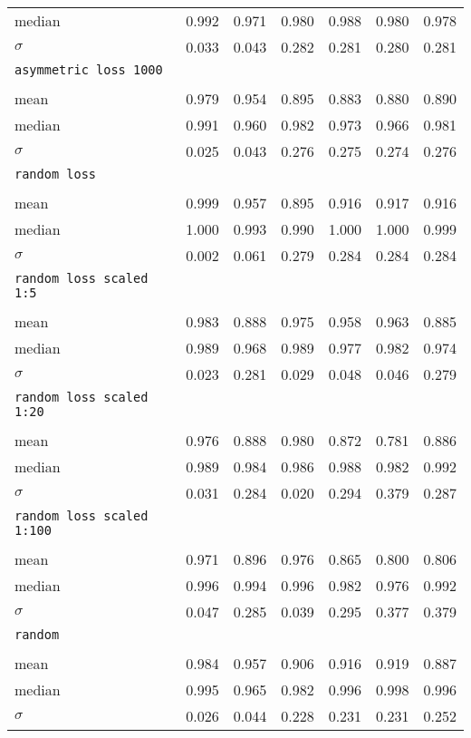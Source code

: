 \begin{center}
\begin{longtabu}{>{\scriptsize}l|>{\scriptsize}l|>{\scriptsize}l|>{\scriptsize}l|>{\scriptsize}l|>{\scriptsize}l|>{\scriptsize}l}
median &0.992 &0.971 &0.980 &0.988 &0.980 &0.978 \\
$\sigma$ &0.033 &0.043 &0.282 &0.281 &0.280 &0.281 \\
\hline
\texttt{asymmetric loss 1000} &&&&&& \\ &&&&&&\\
mean &0.979 &0.954 &0.895 &0.883 &0.880 &0.890 \\
median &0.991 &0.960 &0.982 &0.973 &0.966 &0.981 \\
$\sigma$ &0.025 &0.043 &0.276 &0.275 &0.274 &0.276 \\
\hline
\texttt{random loss} &&&&&& \\ &&&&&&\\
mean &0.999 &0.957 &0.895 &0.916 &0.917 &0.916 \\
median &1.000 &0.993 &0.990 &1.000 &1.000 &0.999 \\
$\sigma$ &0.002 &0.061 &0.279 &0.284 &0.284 &0.284 \\
\hline
\texttt{random loss scaled 1:5} &&&&&& \\ &&&&&&\\
mean &0.983 &0.888 &0.975 &0.958 &0.963 &0.885 \\
median &0.989 &0.968 &0.989 &0.977 &0.982 &0.974 \\
$\sigma$ &0.023 &0.281 &0.029 &0.048 &0.046 &0.279 \\
\hline
\texttt{random loss scaled 1:20} &&&&&& \\ &&&&&&\\
mean &0.976 &0.888 &0.980 &0.872 &0.781 &0.886 \\
median &0.989 &0.984 &0.986 &0.988 &0.982 &0.992 \\
$\sigma$ &0.031 &0.284 &0.020 &0.294 &0.379 &0.287 \\
\hline
\texttt{random loss scaled 1:100} &&&&&& \\ &&&&&&\\
mean &0.971 &0.896 &0.976 &0.865 &0.800 &0.806 \\
median &0.996 &0.994 &0.996 &0.982 &0.976 &0.992 \\
$\sigma$ &0.047 &0.285 &0.039 &0.295 &0.377 &0.379 \\
\hline
\texttt{random} &&&&&& \\ &&&&&&\\
mean &0.984 &0.957 &0.906 &0.916 &0.919 &0.887 \\
median &0.995 &0.965 &0.982 &0.996 &0.998 &0.996 \\
$\sigma$ &0.026 &0.044 &0.228 &0.231 &0.231 &0.252 \\

\end{longtabu}
\end{center}
